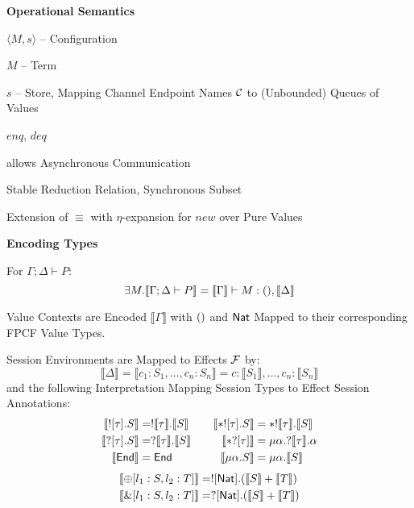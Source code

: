 \textbf{Operational Semantics}

$\langle M,s \rangle$ -- Configuration

$M$ -- Term

$s$ -- Store, Mapping Channel Endpoint Names $\mathcal{C}$ to
(Unbounded) Queues of Values

$enq$, $deq$ %


allows Asynchronous Communication

Stable Reduction Relation, Synchronous Subset

Extension of $\equiv$ with $\eta$-expansion for $new$ over Pure Values


\textbf{Encoding Types}

For $\Gamma;\Delta \vdash P$:
\[
  \exists M.\llbracket \Gamma;\Delta \vdash P \rrbracket
    = \llbracket \Gamma \rrbracket \vdash M:\mathsf{()},
      \llbracket \Delta \rrbracket
\]

Value Contexts are Encoded $\llbracket\Gamma\rrbracket$ with $\mathsf{()}$
and $\mathsf{Nat}$ Mapped to their corresponding FPCF Value Types.

Session Environments are Mapped to Effects $\mathcal{F}$ by:
\[
  \llbracket\Delta\rrbracket
    = \llbracket c_1:S_1, \ldots, c_n:S_n \rrbracket
    = c:\llbracket S_1 \rrbracket, \ldots, c_n:\llbracket S_n \rrbracket
\]
and the following Interpretation Mapping Session Types to Effect
Session Annotations:
\[
  \begin{aligned}
    \llbracket ![\tau].S \rrbracket
      &= !\llbracket\tau\rrbracket.\llbracket S \rrbracket \\
    \llbracket ?[\tau].S \rrbracket
      &= ?\llbracket\tau\rrbracket.\llbracket S \rrbracket \\
    \llbracket\mathsf{End}\rrbracket &= \mathsf{End}
  \end{aligned}
  \quad\quad
  \begin{aligned}
    \llbracket *![\tau].S \rrbracket
      &= *!\llbracket\tau\rrbracket.\llbracket S \rrbracket \\
    \llbracket *?[\tau] \rrbracket
      &= \mu\alpha.?\llbracket\tau\rrbracket.\alpha \\
    \llbracket \mu\alpha.S \rrbracket
      &= \mu\alpha.\llbracket S \rrbracket
  \end{aligned}
\]
\begin{align*}
  \llbracket \oplus[l_1:S,l_2:T] \rrbracket
    &= ![\mathsf{Nat}].(\llbracket S \rrbracket + \llbracket T \rrbracket) \\
  \llbracket \&[l_1:S,l_2:T] \rrbracket
    &= ?[\mathsf{Nat}].(\llbracket S \rrbracket + \llbracket T \rrbracket)
\end{align*}


